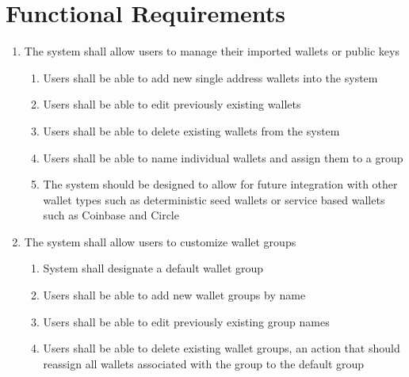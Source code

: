 \section{Functional Requirements}
\begin{adjustwidth}{1.5em}{0pt}




  \begin{enumerate}[label=3.\arabic*]	
		\item The system shall allow users to manage their imported wallets or public keys
      \begin{enumerate}[label*=.\arabic*.]
			\item Users shall be able to add new single address wallets into the system
			\item Users shall be able to edit previously existing wallets
			\item Users shall be able to delete existing wallets from the system
			\item Users shall be able to name individual wallets and assign them to a group
			\item The system should be designed to allow for future integration with other wallet types such as deterministic seed wallets or service based wallets such as Coinbase and Circle
    \end{enumerate}
		
		\item The system shall allow users to customize wallet groups
      \begin{enumerate}[label*=.\arabic*.]
			\item System shall designate a default wallet group
			\item Users shall be able to add new wallet groups by name
			\item Users shall be able to edit previously existing group names
			\item Users shall be able to delete existing wallet groups, an action that should reassign all wallets associated with the group to the default group
		\end{enumerate}
		

\end{enumerate}
\end{adjustwidth}
